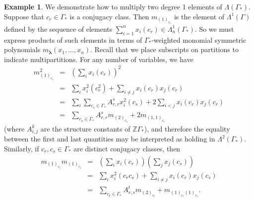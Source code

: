 \documentclass[10pt]{article}
\theoremstyle{definition}
\newtheorem{example}[theorem]{Example}
\newcommand{\bs}{\boldsymbol}
\newcommand{\LambdaG}{\Lambda(\Gamma_*)}
\begin{document}
\begin{example} \label{degree_2_example}
We demonstrate how to multiply two degree 1 elements of $\LambdaG$. Suppose that $c_r \in \Gamma_*$ is a conjugacy class. Then $m_{(1)_{c_r}}$ is the element of $\Lambda^1(\Gamma)$ defined by the sequence of elements $\sum_{i=1}^n x_i(c_r) \in \Lambda_n^1(\Gamma_*)$. So we must express products of such elements in terms of $\Gamma_*$-weighted monomial symmetric polynomials $m_{\bs\lambda}(x_1, \ldots, x_n)$. Recall that we place subscripts on partitions to indicate multipartitions. For any number of variables, we have
\begin{eqnarray*}
m_{(1)_{c_r}}^2 &=& \left( \sum_i x_i(c_r) \right)^2 \\
&=& \sum_i x_i^2(c_r^2) +  \sum_{i \neq j} x_i(c_r) x_j(c_r) \\
&=& \sum_i \sum_{c_s \in \Gamma_*} A_{r,r}^s x_i^2(c_s) + 2 \sum_{i<j} x_i(c_r) x_j(c_r) \\
&=& \sum_{c_s \in \Gamma_*} A_{r,r}^s m_{(2)_{c_s}} + 2 m_{(1,1)_{c_r}}
\end{eqnarray*}
(where $A_{i,j}^k$ are the structure constants of $\mathbb{Z}\Gamma_*$), and therefore the equality between the first and last quantities may be interpreted as holding in $\Lambda^2(\Gamma_*)$. Similarly, if $c_r,c_s \in \Gamma_*$ are distinct conjugacy classes, then 
\begin{eqnarray*}
m_{(1)_{c_r}}m_{(1)_{c_s}} &=& \left( \sum_i x_i(c_r) \right)\left( \sum_j x_j(c_s) \right) \\
&=& \sum_i x_i^2(c_rc_s) +  \sum_{i \neq j} x_i(c_r) x_j(c_s) \\
&=& \sum_{c_t \in \Gamma_*} A_{r,s}^t m_{(2)_{c_t}} +  m_{(1)_{c_r}(1)_{c_s}}.
\end{eqnarray*}
\end{example}
\end{document}
